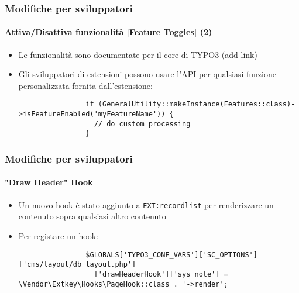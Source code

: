 \begin{frame}[fragile]
	\frametitle{Modifiche per sviluppatori}
	\framesubtitle{Attiva/Disattiva funzionalità [Feature Toggles] (2)}

	\lstset{basicstyle=\tiny\ttfamily}

	\begin{itemize}

		\item Le funzionalità sono documentate per il core di TYPO3\newline
			\small
				(add link)
			\normalsize

		\item Gli sviluppatori di estensioni possono usare l'API per qualsiasi funzione	
			personalizzata fornita dall'estensione:

			\begin{lstlisting}
				if (GeneralUtility::makeInstance(Features::class)->isFeatureEnabled('myFeatureName')) {
				  // do custom processing
				}
			\end{lstlisting}

	\end{itemize}

\end{frame}


\begin{frame}[fragile]
	\frametitle{Modifiche per sviluppatori}
	\framesubtitle{"Draw Header" Hook}

	\lstset{basicstyle=\tiny\ttfamily}

	\begin{itemize}
		\item Un nuovo hook è stato aggiunto a \texttt{EXT:recordlist}
			per renderizzare un contenuto sopra qualsiasi altro contenuto

		\item Per registare un hook:

			\begin{lstlisting}
				$GLOBALS['TYPO3_CONF_VARS']['SC_OPTIONS']['cms/layout/db_layout.php']
				  ['drawHeaderHook']['sys_note'] = \Vendor\Extkey\Hooks\PageHook::class . '->render';
			\end{lstlisting}

	\end{itemize}

\end{frame}

